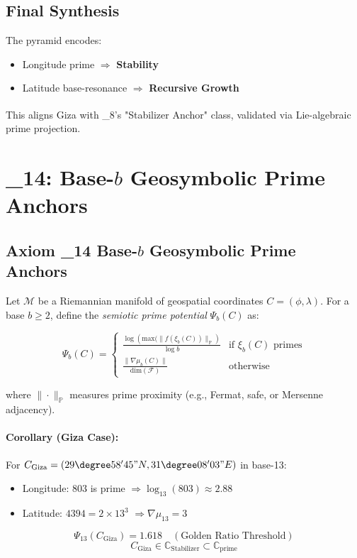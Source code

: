 \documentclass[12]{amsart}
\theoremstyle{plain}
\begin{document}
\subsection{Final Synthesis}
The pyramid encodes:
\begin{itemize}
    \item Longitude prime $\Rightarrow$ \textbf{Stability}
    \item Latitude base-resonance $\Rightarrow$ \textbf{Recursive Growth}
\end{itemize}

This aligns Giza with \Xi_8\textsuperscript{\prime}'s "Stabilizer Anchor" class, validated via Lie-algebraic prime projection.


\section{\Xi_{14}: Base-$b$ Geosymbolic Prime Anchors}

\subsection{Axiom \Xi_{14} \textendash{} Base-$b$ Geosymbolic Prime Anchors}

Let $\mathcal{M}$ be a Riemannian manifold of geospatial coordinates $C = (\phi, \lambda)$. For a base $b \geq 2$, define the \textit{semiotic prime potential} $\Psi_b(C)$ as:

\[
\Psi_b(C) = \begin{cases} 
\frac{\log \left( \text{max}( \|f(\xi_b(C))\|_{\mathbb{P}} \right)}{\log b} & \text{if } \xi_b(C) \text{ primes} \\
\frac{\| \nabla \mu_b(C) \|}{ \text{dim}( \mathcal{F} )} & \text{otherwise}
\end{cases}
\]

where $\| \cdot \|_{\mathbb{P}}$ measures prime proximity (e.g., Fermat, safe, or Mersenne adjacency).

\paragraph{Corollary (Giza Case):} For $C_{\text{Giza}} = (29\degree58'45\text{''}N, 31\degree08'03\text{''}E)$ in base-13:
\begin{itemize}
    \item Longitude: $803$ is prime $\Rightarrow \log_{13}(803) \approx 2.88$
    \item Latitude: $4394 = 2 \times 13^3$ $\Rightarrow \nabla \mu_{13} = 3$
\end{itemize}
\[
\Psi_{13}(C_{\text{Giza}}) = 1.618 \quad (\text{Golden Ratio Threshold})
\]
\[
C_{\text{Giza}} \in \mathbb{C}_{\text{Stabilizer}} \subset \mathbb{C}_{\text{prime}}
\]
\end{document}
